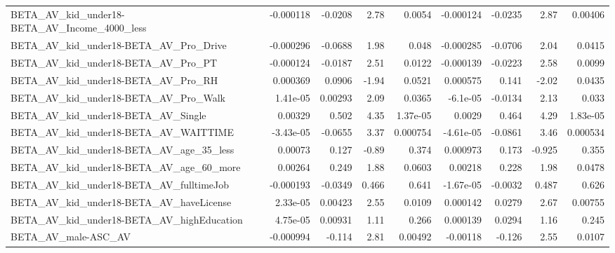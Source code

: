 \begin{tabular}{lrrrrrrrr}
BETA\_AV\_kid\_under18-BETA\_AV\_Income\_4000\_less       &   -0.000118 &      -0.0208 &      2.78 &   0.0054 &  -0.000124 &     -0.0235 &         2.87 &       0.00406 \\
BETA\_AV\_kid\_under18-BETA\_AV\_Pro\_Drive              &   -0.000296 &      -0.0688 &      1.98 &    0.048 &  -0.000285 &     -0.0706 &         2.04 &        0.0415 \\
BETA\_AV\_kid\_under18-BETA\_AV\_Pro\_PT                 &   -0.000124 &      -0.0187 &      2.51 &   0.0122 &  -0.000139 &     -0.0223 &         2.58 &        0.0099 \\
BETA\_AV\_kid\_under18-BETA\_AV\_Pro\_RH                 &    0.000369 &       0.0906 &     -1.94 &   0.0521 &   0.000575 &       0.141 &        -2.02 &        0.0435 \\
BETA\_AV\_kid\_under18-BETA\_AV\_Pro\_Walk               &    1.41e-05 &      0.00293 &      2.09 &   0.0365 &   -6.1e-05 &     -0.0134 &         2.13 &         0.033 \\
BETA\_AV\_kid\_under18-BETA\_AV\_Single                 &     0.00329 &        0.502 &      4.35 & 1.37e-05 &     0.0029 &       0.464 &         4.29 &      1.83e-05 \\
BETA\_AV\_kid\_under18-BETA\_AV\_WAITTIME               &   -3.43e-05 &      -0.0655 &      3.37 & 0.000754 &  -4.61e-05 &     -0.0861 &         3.46 &      0.000534 \\
BETA\_AV\_kid\_under18-BETA\_AV\_age\_35\_less            &     0.00073 &        0.127 &     -0.89 &    0.374 &   0.000973 &       0.173 &       -0.925 &         0.355 \\
BETA\_AV\_kid\_under18-BETA\_AV\_age\_60\_more            &     0.00264 &        0.249 &      1.88 &   0.0603 &    0.00218 &       0.228 &         1.98 &        0.0478 \\
BETA\_AV\_kid\_under18-BETA\_AV\_fulltimeJob            &   -0.000193 &      -0.0349 &     0.466 &    0.641 &  -1.67e-05 &     -0.0032 &        0.487 &         0.626 \\
BETA\_AV\_kid\_under18-BETA\_AV\_haveLicense            &    2.33e-05 &      0.00423 &      2.55 &   0.0109 &   0.000142 &      0.0279 &         2.67 &       0.00755 \\
BETA\_AV\_kid\_under18-BETA\_AV\_highEducation          &    4.75e-05 &      0.00931 &      1.11 &    0.266 &   0.000139 &      0.0294 &         1.16 &         0.245 \\
BETA\_AV\_male-ASC\_AV                                &   -0.000994 &       -0.114 &      2.81 &  0.00492 &   -0.00118 &      -0.126 &         2.55 &        0.0107 \\

\end{tabular}
